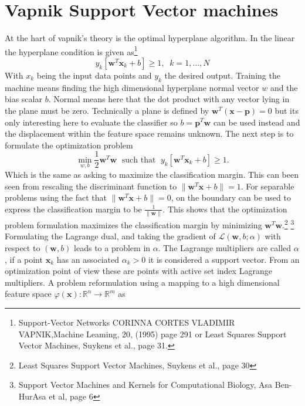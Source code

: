 \section{Vapnik Support Vector machines}
At the hart of vapnik's theory is the optimal hyperplane algorithm. In the linear the hyperplane condition is given as\footnote{Support-Vector Networks
CORINNA CORTES VLADIMIR VAPNIK,Machine Leaming, 20, (1995) page 291 or Least Squares Support Vector Machines, Suykens et al., page 31.}
\begin{equation}
y_k [\mathbf{w}^T \mathbf{x}_k + b] \geq 1, \;\; k = 1,\dots,N
\end{equation}
With $x_k$ being the input data points and $y_k$ the desired output. Training the machine means finding the high dimensional hyperplane normal vector $w$ and the bias scalar $b$. Normal means here that the dot product with any vector lying in the plane must be zero. Technically a plane is defined by $\mathbf{w}^T(\mathbf{x} - \mathbf{p}) = 0$ but its only interesting here to evaluate the classifier so $b = \mathbf{p}^T \mathbf{w}$ can be used instead and the displacement within the feature space remains unknown.
The next step is to formulate the optimization problem
\begin{equation}
\min_{w,b} \frac{1}{2} \mathbf{w}^T \mathbf{w} \;\text{ such that }\; y_k [\mathbf{w}^T \mathbf{x}_k + b] \geq 1.
\end{equation}
Which is the same as asking to maximize the classification margin. This can been seen from rescaling the discriminant function to $\| \mathbf{w}^T \mathbf{x} + b \| = 1$. For separable problems using the fact that $\| \mathbf{w}^T \mathbf{x} + b \| = 0$, on the boundary can be used to express the classification margin to be $\frac{1}{\|\mathbf{w}\|}$. This shows that the optimization problem formulation maximizes the classification margin by minimizing $\mathbf{w}^T \mathbf{w}$.\footnote{Least Squares Support Vector Machines, Suykens et al., page 30} \footnote{Support Vector Machines and Kernels for Computational Biology, Asa Ben-HurAsa et al, page 6}
Formulating the Lagrange dual, and taking the gradient of $\mathcal{L}(\mathbf{w},b;\alpha)$ with respect to $(\mathbf{w},b)$ leads to a problem in $\alpha$. The Lagrange multipliers are called $\alpha$, if a point $\mathbf{x}_k$ has an associated $\alpha_k > 0$ it is considered a support vector. From an optimization point of view these are points with active set index Lagrange multipliers. A problem reformulation using a mapping to a high dimensional feature space $\varphi(\mathbf{x}): \mathbb{R}^n \rightarrow \mathbb{R}^m$ as

